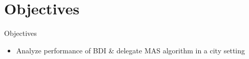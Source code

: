 \section{Objectives}


\begin{frame}{Objectives}
    \begin{itemize}
        \item Analyze performance of BDI \& delegate MAS algorithm in a city setting
    \end{itemize}
\end{frame}
